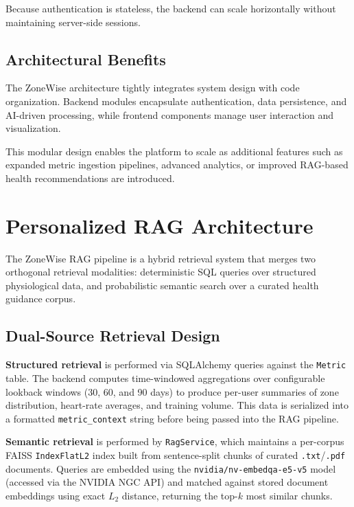 \documentclass[11pt,twocolumn]{article}
\begin{document}
Because authentication is stateless, the backend can scale horizontally without maintaining server-side sessions.

\subsection{Architectural Benefits}

The ZoneWise architecture tightly integrates system design with code organization. Backend modules encapsulate authentication, data persistence, and AI-driven processing, while frontend components manage user interaction and visualization.

This modular design enables the platform to scale as additional features such as expanded metric ingestion pipelines, advanced analytics, or improved RAG-based health recommendations are introduced.


\section{Personalized RAG Architecture}

The ZoneWise RAG pipeline is a hybrid retrieval system that merges two orthogonal retrieval modalities: deterministic SQL queries over structured physiological data, and probabilistic semantic search over a curated health guidance corpus.

\subsection{Dual-Source Retrieval Design}

\textbf{Structured retrieval} is performed via SQLAlchemy queries against the \texttt{Metric} table. The backend computes time-windowed aggregations over configurable lookback windows (30, 60, and 90 days) to produce per-user summaries of zone distribution, heart-rate averages, and training volume. This data is serialized into a formatted \texttt{metric\_context} string before being passed into the RAG pipeline.

\textbf{Semantic retrieval} is performed by \texttt{RagService}, which maintains a per-corpus FAISS \texttt{IndexFlatL2} index built from sentence-split chunks of curated \texttt{.txt}/\texttt{.pdf} documents. Queries are embedded using the \texttt{nvidia/nv-embedqa-e5-v5} model (accessed via the NVIDIA NGC API) and matched against stored document embeddings using exact $L_2$ distance, returning the top-$k$ most similar chunks.
\end{document}
